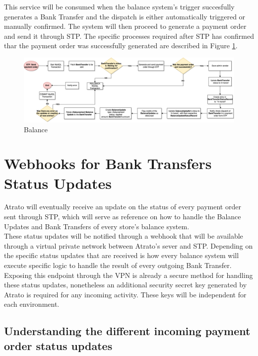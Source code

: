 This service will be consumed when the balance system's trigger succesfully generates a Bank Transfer and the dispatch is either automatically triggered or manually confirmed. The system will then proceed to generate a payment order and send it through STP. The specific processes required after STP has confirmed thar the payment order was successfully generated are described in Figure \ref{fig:stp_send_payment_order}.

\begin{figure}[H]
    \centering
    \includegraphics[scale = 0.3]{assets/flowcharts/STP_Send_Payment_Order.png}
    \caption{Balance}\label{fig:stp_send_payment_order}
\end{figure}

\section{Webhooks for Bank Transfers Status Updates}

Atrato will eventually receive an update on the status of every payment order sent through STP, which will serve as reference on how to handle the Balance Updates and Bank Transfers of every store’s balance system.\\

These status updates will be notified through a webhook that will be available through a virtual private network between Atrato’s sever and STP. Depending on the specific status updates that are received is how every balance system will execute specific logic to handle the result of every outgoing Bank Transfer.\\

Exposing this endpoint through the VPN is already a secure method for handling these status updates, nonetheless an additional security secret key generated by Atrato is required for any incoming activity. These keys will be independent for each environment.\\

\subsection{Understanding the different incoming payment order status updates}

